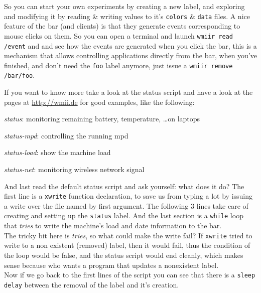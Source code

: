 \documentclass[12pt,a4paper]{article} %
\newcommand{\hrefx}[1]{\href{#1}{#1}} %
\newenvironment{itemize*}
  {\begin{itemize}
      \setlength{\itemsep}{0pt}
      \setlength{\parskip}{0pt}}
  {\end{itemize}}
\begin{document}
    So you can start your own experiments by creating a new label, and
    exploring and modifying it by reading \& writing values to it's
    \verb+colors+ \& \verb+data+ files.  A nice feature of the bar
    (and clients) is that they generate events corresponding to mouse
    clicks on them.  So you can open a terminal and launch
    \verb+wmiir read /event+ and and see how the events are generated
    when you click the bar, this is a mechanism that allows
    controlling applications directly from the bar, when you've
    finished, and don't need the \verb+foo+ label anymore, just issue
    a \verb+wmiir remove /bar/foo+.
  
    If you want to know more take a look at the status script and have
    a look at the pages at \hrefx{http://wmii.de} for good examples,
    like the following:

    \begin{itemize*}
    \item \emph{status}: monitoring remaining battery, temperature, \dots on laptops
    \item \emph{status-mpd}: controlling the running mpd
    \item \emph{status-load}: show the machine load
    \item \emph{status-net}: monitoring wireless network signal
    \end{itemize*}
  
    And last read the default status script and ask yourself: what
    does it do?   The first line is a
    \verb+xwrite+ function declaration, to save us from typing a lot
    by issuing a write over the file named by first argument. The
    following 3 lines take care of creating and setting up the
    \verb+status+ label. And the last section is a \verb+while+ loop
    that \emph{tries} to write the machine's load and date information
    to the bar.\\
  
    The tricky bit here is \emph{tries}, so what could make the write
    fail? If \verb+xwrite+ tried to write to a non existent (removed)
    label, then it would fail, thus the condition of the loop would be
    false, and the status script would end cleanly, which makes sense
    because who wants a program that updates a nonexistent label.\\

    Now if we go back to the first lines of the script you can see
    that there is a \verb+sleep delay+ between the removal of the
    label and it's creation.
  
\end{document}

